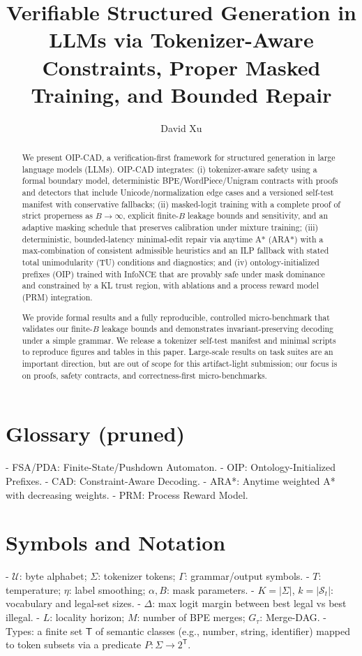 \documentclass{article}
\title{Verifiable Structured Generation in LLMs via Tokenizer-Aware Constraints, Proper Masked Training, and Bounded Repair}
\author[1]{David Xu}
\affil[1]{China Mobile Research Institute}
\date{}
\begin{document}
\maketitle

\begin{abstract}
We present OIP-CAD, a verification-first framework for structured generation in large language models (LLMs). OIP-CAD integrates: (i) tokenizer-aware safety using a formal boundary model, deterministic BPE/WordPiece/Unigram contracts with proofs and detectors that include Unicode/normalization edge cases and a versioned self-test manifest with conservative fallbacks; (ii) masked-logit training with a complete proof of strict properness as $B\to\infty$, explicit finite-$B$ leakage bounds and sensitivity, and an adaptive masking schedule that preserves calibration under mixture training; (iii) deterministic, bounded-latency minimal-edit repair via anytime A* (ARA*) with a max-combination of consistent admissible heuristics and an ILP fallback with stated total unimodularity (TU) conditions and diagnostics; and (iv) ontology-initialized prefixes (OIP) trained with InfoNCE that are provably safe under mask dominance and constrained by a KL trust region, with ablations and a process reward model (PRM) integration.

We provide formal results and a fully reproducible, controlled micro-benchmark that validates our finite-$B$ leakage bounds and demonstrates invariant-preserving decoding under a simple grammar. We release a tokenizer self-test manifest and minimal scripts to reproduce figures and tables in this paper. Large-scale results on task suites are an important direction, but are out of scope for this artifact-light submission; our focus is on proofs, safety contracts, and correctness-first micro-benchmarks.
\end{abstract}

\section*{Glossary (pruned)}
- FSA/PDA: Finite-State/Pushdown Automaton.
- OIP: Ontology-Initialized Prefixes.
- CAD: Constraint-Aware Decoding.
- ARA*: Anytime weighted A* with decreasing weights.
- PRM: Process Reward Model.

\section*{Symbols and Notation}
- $\mathcal{U}$: byte alphabet; $\Sigma$: tokenizer tokens; $\Gamma$: grammar/output symbols.
- $T$: temperature; $\eta$: label smoothing; $\alpha,B$: mask parameters.
- $K=|\Sigma|$, $k=|\mathcal{S}_t|$: vocabulary and legal-set sizes.
- $\Delta$: max logit margin between best legal vs best illegal.
- $L$: locality horizon; $M$: number of BPE merges; $G_\tau$: Merge-DAG.
- Types: a finite set $\mathsf{T}$ of semantic classes (e.g., number, string, identifier) mapped to token subsets via a predicate $P:\Sigma\to 2^{\mathsf{T}}$.
\end{document}
